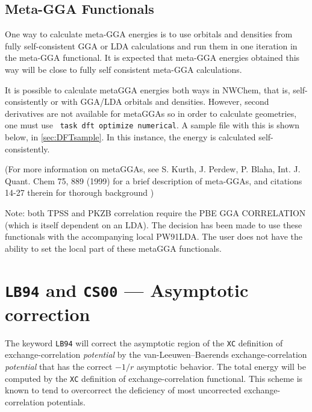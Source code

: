 %



\subsection{Meta-GGA Functionals}


One way to calculate meta-GGA energies is to use
 orbitals and densities 
from fully self-consistent GGA or LDA calculations
and run them in one iteration in the meta-GGA functional.
It is expected that meta-GGA energies obtained
this way will be close to fully self consistent
meta-GGA calculations. 

It is possible to calculate metaGGA energies both ways
in NWChem, that is, self-consistently or with
GGA/LDA orbitals and densities.  However, second derivatives
are not available for metaGGAs so in order to
calculate geometries, one must use
\verb+ task dft optimize numerical+.
A sample file with this is shown below,
in \ref{sec:DFTsample}.  In this instance, the
energy is calculated self-consistently.


(For more information on metaGGAs,  see
S. Kurth, J. Perdew, P. Blaha, Int. J. Quant. Chem 75, 889 (1999)
for a brief description of meta-GGAs, and  citations 14-27
therein for thorough background )

Note:  both TPSS and PKZB correlation
require the PBE GGA CORRELATION (which is itself dependent on an LDA).  
The decision has been made to
use these functionals with the accompanying local
PW91LDA.  The user does not have the ability to set
the local part of these metaGGA functionals.


\section{{\tt LB94} and {\tt CS00} --- Asymptotic correction}

The keyword \verb+LB94+ will correct the asymptotic region of 
the \verb+XC+ definition of exchange-correlation {\it potential} by 
the van-Leeuwen--Baerends exchange-correlation {\it potential} that
has the correct $-1/r$ asymptotic behavior.  The total energy will be computed by the 
\verb+XC+ definition of exchange-correlation functional.  This scheme is known to
tend to overcorrect the deficiency of most uncorrected exchange-correlation potentials.

